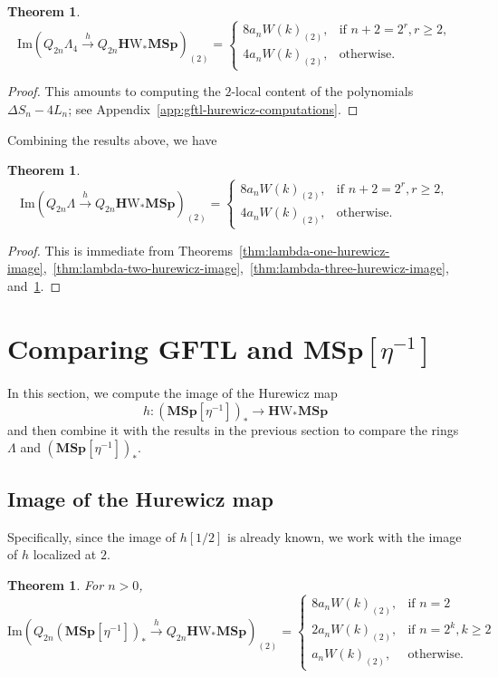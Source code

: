 \documentclass[a4paper]{amsart}
\theoremstyle{plain}
\newtheorem{theorem}[subsubsection]{Theorem}
\theoremstyle{definition}
\newcommand{\MSp}{\mathbf{MSp}}
\newcommand{\etainv}{\eta^{-1}}
\newcommand{\MSpetainv}{{\MSp[\etainv]}}
\newcommand{\HW}{\mathbf{H}\mathrm{W}}
\renewcommand{\ge}{\geqslant}
\begin{document}
\begin{theorem}\label{thm:lambda-four-hurewicz-image}
	\[
		\mathrm{Im} \left(Q_{2n}\Lambda_4\xrightarrow{h}Q_{2n}\HW_*\MSp\right)_{(2)} = \begin{cases}
			8a_n W(k)_{(2)}, & \text{if }n+2=2^{r}, r\ge 2, \\
			4a_n W(k)_{(2)}, & \text{otherwise}.
		\end{cases}
	\]
\end{theorem}
\begin{proof}
	This amounts to computing the $2$-local content of the polynomials $\Delta S_n-4L_n$; see Appendix~\ref{app:gftl-hurewicz-computations}.
\end{proof}

Combining the results above, we have
\begin{theorem} \label{thm:lambda-hurewicz-image-localized}
	\[
		\mathrm{Im} \left(Q_{2n} \Lambda \xrightarrow{h} Q_{2n} \HW_*\MSp\right)_{(2)} = \begin{cases}
			8 a_n W(k)_{(2)}, & \text{if }n + 2 = 2^{r}, r\ge 2, \\
			4 a_n W(k)_{(2)}, & \text{otherwise}.
		\end{cases}
	\]
\end{theorem}
\begin{proof}
	This is immediate from Theorems~\ref{thm:lambda-one-hurewicz-image},~\ref{thm:lambda-two-hurewicz-image},~\ref{thm:lambda-three-hurewicz-image}, and~\ref{thm:lambda-four-hurewicz-image}.
\end{proof}

\section{Comparing GFTL and \texorpdfstring{$\MSpetainv$}{MSp[η−1]}}\label{sec:comparing-gftl-and-msp}

In this section, we compute the image of the Hurewicz map
\[
	h: (\MSpetainv)_* \to \HW_*\MSp
\]
and then combine it with the results in the previous section to compare the rings $\Lambda$ and $(\MSpetainv)_*$.

\subsection{Image of the Hurewicz map}
Specifically, since the image of $h[1/2]$ is already known, we work with the image of $h$ localized at $2$.

\begin{theorem} \label{thm:msp-eta-inverted-hurewicz-image}
	For $n > 0$,
	\[
		\mathrm{Im} \left(Q_{2n} (\MSpetainv)_* \xrightarrow{h} Q_{2n} \HW_*\MSp\right)_{(2)} = \begin{cases}
			8 a_n W(k)_{(2)}, & \text{if }n=2             \\
			2 a_n W(k)_{(2)}, & \text{if }n=2^{k}, k\ge 2 \\
			a_n W(k)_{(2)},   & \text{otherwise.}
		\end{cases}
	\]
\end{theorem}
\end{document}
